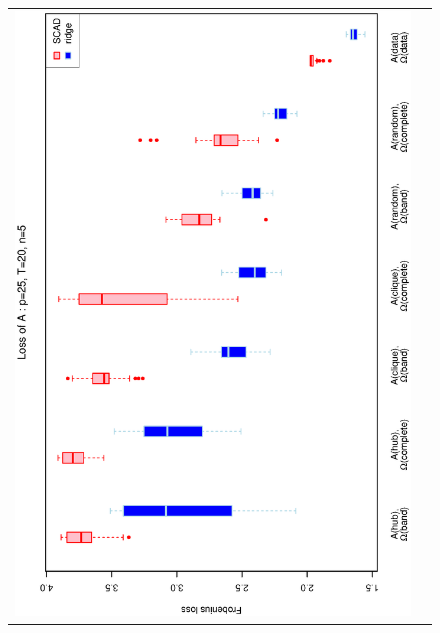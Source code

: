\documentclass[a4paper]{article}
\begin{document}
\begin{figure}[h!]
\centering
\begin{tabular}{cc}
\includegraphics[scale=0.45,angle=270]{LossA25T20N5_25.eps}
\\

\end{tabular}
\end{figure}
\end{document}
